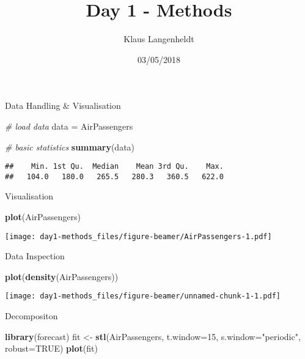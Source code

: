 \documentclass[ignorenonframetext,]{beamer}
\title{Day 1 - Methods}
\author{Klaus Langenheldt}
\date{03/05/2018}
\newenvironment{Shaded}{\begin{snugshade}}{\end{snugshade}}
\newcommand{\KeywordTok}[1]{\textcolor[rgb]{0.13,0.29,0.53}{\textbf{#1}}}
\newcommand{\DataTypeTok}[1]{\textcolor[rgb]{0.13,0.29,0.53}{#1}}
\newcommand{\DecValTok}[1]{\textcolor[rgb]{0.00,0.00,0.81}{#1}}
\newcommand{\StringTok}[1]{\textcolor[rgb]{0.31,0.60,0.02}{#1}}
\newcommand{\CommentTok}[1]{\textcolor[rgb]{0.56,0.35,0.01}{\textit{#1}}}
\newcommand{\OtherTok}[1]{\textcolor[rgb]{0.56,0.35,0.01}{#1}}
\newcommand{\NormalTok}[1]{#1}
\begin{document}
\frame{\titlepage}

\begin{frame}[fragile]

\begin{block}{Data Handling \& Visualisation}

\begin{Shaded}
\begin{Highlighting}[]
\CommentTok{# load data}
\NormalTok{data =}\StringTok{ }\NormalTok{AirPassengers}

\CommentTok{# basic statistics}
\KeywordTok{summary}\NormalTok{(data)}
\end{Highlighting}
\end{Shaded}

\begin{verbatim}
##    Min. 1st Qu.  Median    Mean 3rd Qu.    Max. 
##   104.0   180.0   265.5   280.3   360.5   622.0
\end{verbatim}

\end{block}

\begin{block}{Visualisation}

\begin{Shaded}
\begin{Highlighting}[]
\KeywordTok{plot}\NormalTok{(AirPassengers)}
\end{Highlighting}
\end{Shaded}

\texttt{[image: day1-methods\_files/figure-beamer/AirPassengers-1.pdf]}

\end{block}

\begin{block}{Data Inspection}

\begin{Shaded}
\begin{Highlighting}[]
\KeywordTok{plot}\NormalTok{(}\KeywordTok{density}\NormalTok{(AirPassengers))}
\end{Highlighting}
\end{Shaded}

\texttt{[image: day1-methods\_files/figure-beamer/unnamed-chunk-1-1.pdf]}

\end{block}

\begin{block}{Decompositon}

\begin{Shaded}
\begin{Highlighting}[]
\KeywordTok{library}\NormalTok{(forecast)}
\NormalTok{fit <-}\StringTok{ }\KeywordTok{stl}\NormalTok{(AirPassengers, }\DataTypeTok{t.window=}\DecValTok{15}\NormalTok{, }\DataTypeTok{s.window=}\StringTok{"periodic"}\NormalTok{, }\DataTypeTok{robust=}\OtherTok{TRUE}\NormalTok{)}
\KeywordTok{plot}\NormalTok{(fit)}
\end{Highlighting}
\end{Shaded}


\end{block}
\end{frame}
\end{document}

